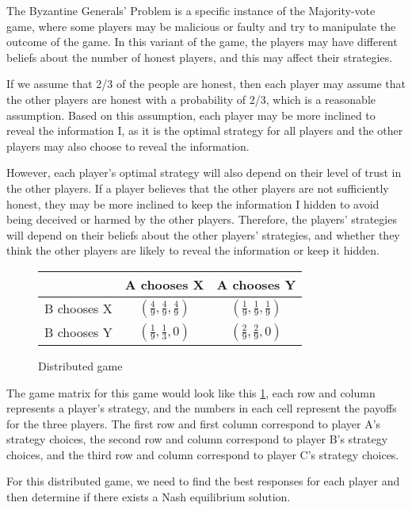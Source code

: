 \documentclass[twocolumn]{article}
\begin{document}
The Byzantine Generals' Problem is a specific instance of the Majority-vote game, where some players may be malicious or faulty and try to manipulate the outcome of the game. In this variant of the game, the players may have different beliefs about the number of honest players, and this may affect their strategies.

If we assume that 2/3 of the people are honest, then each player may assume that the other players are honest with a probability of 2/3, which is a reasonable assumption. Based on this assumption, each player may be more inclined to reveal the information I, as it is the optimal strategy for all players and the other players may also choose to reveal the information.

However, each player's optimal strategy will also depend on their level of trust in the other players. If a player believes that the other players are not sufficiently honest, they may be more inclined to keep the information I hidden to avoid being deceived or harmed by the other players. Therefore, the players' strategies will depend on their beliefs about the other players' strategies, and whether they think the other players are likely to reveal the information or keep it hidden.

\begin{figure}[htbp]
  \begin{center}
\begin{tabular}{c|cc}
& A chooses X & A chooses Y \\
\hline
B chooses X & $(\frac{4}{9}, \frac{4}{9}, \frac{4}{9})$ & $(\frac{1}{9}, \frac{1}{9}, \frac{1}{9})$ \\
B chooses Y & $(\frac{1}{9}, \frac{1}{3}, 0)$ & $(\frac{2}{9}, \frac{2}{9}, 0)$ \\
\end{tabular}
\end{center}
\label{dgame}
\caption{Distributed game}
\end{figure}

The game matrix for this game would look like this \ref{dgame}, each row and column represents a player's strategy, and the numbers in each cell represent the payoffs for the three players. The first row and first column correspond to player A's strategy choices, the second row and column correspond to player B's strategy choices, and the third row and column correspond to player C's strategy choices.

For this distributed game, we need to find the best responses for each player and then determine if there exists a Nash equilibrium solution.
\end{document}
